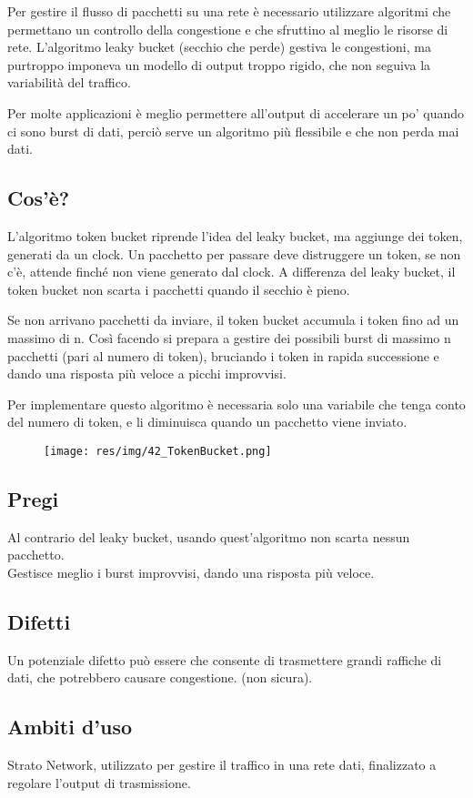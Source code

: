 Per gestire il flusso di pacchetti su una rete è necessario utilizzare algoritmi che permettano un controllo della congestione e che sfruttino al meglio le risorse di rete. L'algoritmo leaky bucket (secchio che perde) gestiva le congestioni, ma purtroppo imponeva un modello di output troppo rigido, che non seguiva la variabilità del traffico.

Per molte applicazioni è meglio permettere all'output di accelerare un po' quando ci sono burst di dati, perciò serve un algoritmo più flessibile e che non perda mai dati.
\subsection{Cos'è?}
L'algoritmo token bucket riprende l'idea del leaky bucket, ma aggiunge dei token, generati da un clock.
Un pacchetto per passare deve distruggere un token, se non c'è, attende finché non viene generato dal clock. A differenza del leaky bucket, il token bucket non scarta i pacchetti quando il secchio è pieno.

Se non arrivano pacchetti da inviare, il token bucket accumula i token fino ad un massimo di n. Così facendo si prepara a gestire dei possibili burst di massimo n pacchetti (pari al numero di token), bruciando i token in rapida successione e dando una risposta più veloce a picchi improvvisi.

Per implementare questo algoritmo è necessaria solo una variabile che tenga conto del numero di token, e li diminuisca quando un pacchetto viene inviato.

\begin{figure}[H]
\centering
\texttt{[image: res/img/42\_TokenBucket.png]}
\end{figure}
 
\subsection{Pregi}
Al contrario del leaky bucket, usando quest'algoritmo non scarta nessun pacchetto.\\
Gestisce meglio i burst improvvisi, dando una risposta più veloce.
\subsection{Difetti}
Un potenziale difetto può essere che consente di trasmettere grandi raffiche di dati, che potrebbero causare congestione. (non sicura).
\subsection{Ambiti d'uso}
Strato Network, utilizzato per gestire il traffico in una rete dati, finalizzato a regolare l'output di trasmissione.

